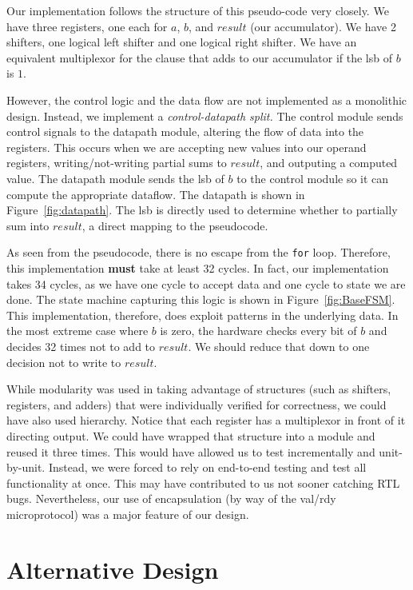 \documentclass[11pt]{article}
\begin{document}
Our implementation follows the structure of this pseudo-code very closely.
We have three registers, one each for $a$, $b$, and $result$ (our accumulator).
We have 2 shifters, one logical left shifter and one logical right shifter. 
We have an equivalent multiplexor for the clause that adds to our accumulator if the lsb of $b$ is $1$.

However, the control logic and the data flow are not implemented as a monolithic design.
Instead, we implement a \textit{control-datapath split.}
The control module sends control signals to the datapath module, altering the flow of data into the registers.
This occurs when we are accepting new values into our operand registers,
writing/not-writing partial sums to $result$, and outputing a computed value.
The datapath module sends the lsb of $b$ to the control module so it can compute the appropriate dataflow.
The datapath is shown in Figure~\ref{fig:datapath}.
The lsb is directly used to determine whether to partially sum into $result$, a direct mapping to the pseudocode.

As seen from the pseudocode, there is no escape from the \verb+for+ loop.
Therefore, this implementation \textbf{must} take at least 32 cycles.
In fact, our implementation takes 34 cycles, as we have one cycle to accept data and one cycle to state we are done.
The state machine capturing this logic is shown in Figure~\ref{fig:BaseFSM}. 
This implementation, therefore, does exploit patterns in the underlying data.
In the most extreme case where $b$ is zero, the hardware checks every bit of $b$ and decides 32 times not to add to $result$.
We should reduce that down to one decision not to write to $result$.

While modularity was used in taking advantage of structures (such as shifters, registers, and adders) that were individually verified for correctness, we could have also used hierarchy. Notice that each register has a multiplexor in front of it directing output.
We could have wrapped that structure into a module and reused it three times. 
This would have allowed us to test incrementally and unit-by-unit.
Instead, we were forced to rely on end-to-end testing and test all functionality at once. This may have contributed to us not sooner catching RTL bugs.
Nevertheless, our use of encapsulation (by way of the val/rdy microprotocol) was a major feature of our design.

\section{Alternative Design}
\end{document}
